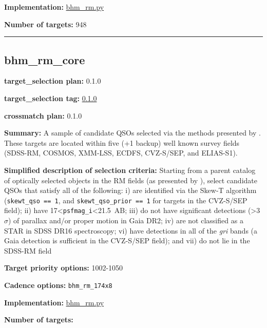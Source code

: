 \noindent\textbf{Implementation:}
\href{https://github.com/sdss/target_selection/blob/0.1.0/python/target_selection/cartons/bhm_rm.py}{bhm\_rm.py}

\noindent\textbf{Number of targets:} 948

\begin{center}\rule{0.5\linewidth}{0.5pt}\end{center}

\hypertarget{bhm_rm_core_plan0.1.0}{%
\subsection{bhm\_rm\_core}\label{bhm_rm_core_plan0.1.0}}

\noindent\textbf{target\_selection plan:} 0.1.0

\noindent\textbf{target\_selection tag:}
\href{https://github.com/sdss/target_selection/tree/0.1.0/}{0.1.0}

\noindent\textbf{crossmatch plan:} 0.1.0

\noindent\textbf{Summary:} A sample of candidate QSOs selected via the methods
presented by
\citet{Yang2022}. These targets are located within five (+1 backup) well
known survey fields (SDSS-RM, COSMOS, XMM-LSS, ECDFS, CVZ-S/SEP, and
ELIAS-S1).

\noindent\textbf{Simplified description of selection criteria:} Starting from a
parent catalog of optically selected objects in the RM fields (as
presented by
\citealt{Yang2022}), select candidate QSOs that satisfy all of the
following: i) are identified via the Skew-T algorithm
(\texttt{skewt\_qso\ ==\ 1}, and \texttt{skewt\_qso\_prior\ ==\ 1} for
targets in the CVZ-S/SEP field); ii) have
17\textless{}\texttt{psfmag\_i}\textless21.5~AB; iii) do not have
significant detections (\textgreater3$\sigma$) of parallax and/or proper motion
in Gaia DR2; iv) are not classified as a STAR in SDSS DR16 spectroscopy;
vi) have detections in all of the \emph{gri} bands (a Gaia detection is
sufficient in the CVZ-S/SEP field); and vii) do not lie in the SDSS-RM
field


\noindent\textbf{Target priority options:} 1002-1050

\noindent\textbf{Cadence options:} \texttt{bhm\_rm\_174x8}

\noindent\textbf{Implementation:}
\href{https://github.com/sdss/target_selection/blob/0.1.0/python/target_selection/cartons/bhm_rm.py}{bhm\_rm.py}

\noindent\textbf{Number of targets:}


